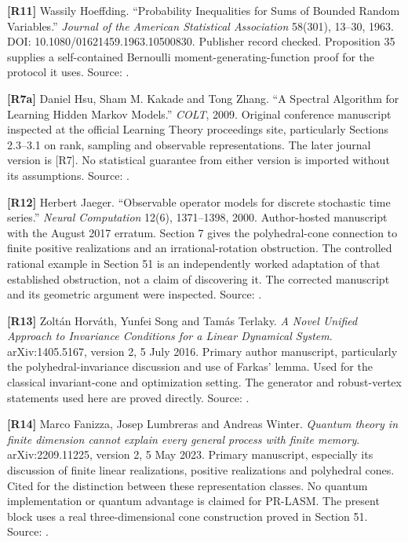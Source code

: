 \documentclass[11pt,oneside,openany]{book}
\numberwithin{equation}{section}
\begin{document}
\textbf{{[}R11{]}} Wassily Hoeffding. ``Probability Inequalities for
Sums of Bounded Random Variables.'' \emph{Journal of the American
Statistical Association} 58(301), 13--30, 1963. DOI:
10.1080/01621459.1963.10500830. Publisher record checked. Proposition 35
supplies a self-contained Bernoulli moment-generating-function proof for
the protocol it uses. Source:
.

\textbf{{[}R7a{]}} Daniel Hsu, Sham M. Kakade and Tong Zhang. ``A
Spectral Algorithm for Learning Hidden Markov Models.'' \emph{COLT},
2009. Original conference manuscript inspected at the official Learning
Theory proceedings site, particularly Sections 2.3--3.1 on rank,
sampling and observable representations. The later journal version is
{[}R7{]}. No statistical guarantee from either version is imported
without its assumptions. Source:
.

\textbf{{[}R12{]}} Herbert Jaeger. ``Observable operator models for
discrete stochastic time series.'' \emph{Neural Computation} 12(6),
1371--1398, 2000. Author-hosted manuscript with the August 2017 erratum.
Section 7 gives the polyhedral-cone connection to finite positive
realizations and an irrational-rotation obstruction. The controlled
rational example in Section 51 is an independently worked adaptation of
that established obstruction, not a claim of discovering it. The
corrected manuscript and its geometric argument were inspected. Source:
.

\textbf{{[}R13{]}} Zoltán Horváth, Yunfei Song and Tamás Terlaky.
\emph{A Novel Unified Approach to Invariance Conditions for a Linear
Dynamical System}. arXiv:1405.5167, version 2, 5 July 2016. Primary
author manuscript, particularly the polyhedral-invariance discussion and
use of Farkas' lemma. Used for the classical invariant-cone and
optimization setting. The generator and robust-vertex statements used
here are proved directly. Source:
.

\textbf{{[}R14{]}} Marco Fanizza, Josep Lumbreras and Andreas Winter.
\emph{Quantum theory in finite dimension cannot explain every general
process with finite memory}. arXiv:2209.11225, version 2, 5 May 2023.
Primary manuscript, especially its discussion of finite linear
realizations, positive realizations and polyhedral cones. Cited for the
distinction between these representation classes. No quantum
implementation or quantum advantage is claimed for PR-LASM. The present
block uses a real three-dimensional cone construction proved in Section
51. Source: .
\end{document}
